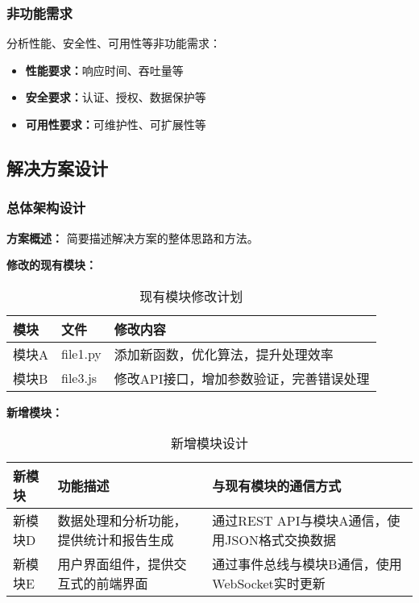 \documentclass[a4paper,12pt]{article}
\begin{document}
\subsubsection{非功能需求}
分析性能、安全性、可用性等非功能需求：
\begin{itemize}
    \item \textbf{性能要求：}响应时间、吞吐量等
    \item \textbf{安全要求：}认证、授权、数据保护等
    \item \textbf{可用性要求：}可维护性、可扩展性等
\end{itemize}

\subsection{解决方案设计}

\subsubsection{总体架构设计}

\textbf{方案概述：}
简要描述解决方案的整体思路和方法。

\textbf{修改的现有模块：}
\begin{table}[H]
\centering
\begin{tabular}{|l|l|p{6cm}|}
\hline
\textbf{模块} & \textbf{文件} & \textbf{修改内容} \\
\hline
模块A & file1.py & 添加新函数，优化算法，提升处理效率 \\
\hline
模块B & file3.js & 修改API接口，增加参数验证，完善错误处理 \\
\hline
\end{tabular}
\caption{现有模块修改计划}
\end{table}

\textbf{新增模块：}
\begin{table}[H]
\centering
\begin{tabular}{|l|p{5cm}|p{5cm}|}
\hline
\textbf{新模块} & \textbf{功能描述} & \textbf{与现有模块的通信方式} \\
\hline
新模块D & 数据处理和分析功能，提供统计和报告生成 & 通过REST API与模块A通信，使用JSON格式交换数据 \\
\hline
新模块E & 用户界面组件，提供交互式的前端界面 & 通过事件总线与模块B通信，使用WebSocket实时更新 \\
\hline
\end{tabular}
\caption{新增模块设计}
\end{table}
\end{document}
